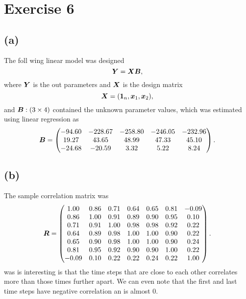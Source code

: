 
\section*{Exercise 6}
\label{sec:exercise-6}

\subsection*{(a)}
\label{sec:a-5}


The foll wing linear model was designed
\begin{equation*}
  \bm{Y} = \bm{XB},
\end{equation*}
where $\bm{Y}$ is the out parameters and $\bm{X}$ is the design matrix
\begin{equation*}
  \bm{X} = (\bm{1}_n, \bm{x}_1, \bm{x}_2),
\end{equation*}
and $\bm{B}:(3 \times 4) $ contained the unknown parameter values, which
was estimated using linear regression as
\begin{equation*}
  \bm{B} =
  \begin{pmatrix}
    -94.60 &-228.67 &-258.80 &-246.05 &-232.96 \\ 
    19.27 &43.65 &48.99 &47.33 &45.10 \\ 
    -24.68 &-20.59 &3.32 &5.22 &8.24 
  \end{pmatrix}.
\end{equation*}

\subsection*{(b)}
The sample correlation matrix was 
\begin{equation*}
  \bm{R} =
  \begin{pmatrix}
    1.00 &0.86 &0.71 &0.64 &0.65 &0.81 &-0.09 \\ 
    0.86 &1.00 &0.91 &0.89 &0.90 &0.95 &0.10 \\ 
    0.71 &0.91 &1.00 &0.98 &0.98 &0.92 &0.22 \\ 
    0.64 &0.89 &0.98 &1.00 &1.00 &0.90 &0.22 \\ 
    0.65 &0.90 &0.98 &1.00 &1.00 &0.90 &0.24 \\ 
    0.81 &0.95 &0.92 &0.90 &0.90 &1.00 &0.22 \\ 
    -0.09 &0.10 &0.22 &0.22 &0.24 &0.22 &1.00  
  \end{pmatrix}.
\end{equation*}
was is interesting is that the time steps that are close to each other
correlates more than those times further apart. We can even note that
the first and last time steps have negative correlation an is almost 0.

